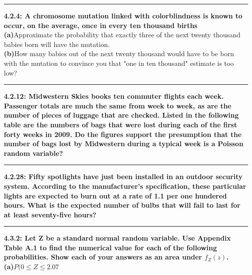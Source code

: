 \documentclass[11pt]{article}
\newcommand\question[2]{\vspace{.25in}\hrule\textbf{#1: #2}\vspace{.5em}\vspace{.10in}}
\renewcommand\part[1]{\vspace{.10in}\textbf{(#1)}}
\begin{document}
\raggedright
\newcommand\NAME{Jonathan Lopez}  %
\newcommand\HWNUM{6}              %



\question{4.2.4}
{A chromosome mutation linked with colorblindness is known to occur, on the average,
once in every ten thousand births}
\\
\part{a}{Approximate the probability that exactly three of the next twenty thousand
babies born will have the mutation.}
\\
\part{b}{How many babies out of the next twenty thousand would have to be born with
the mutation to convince you that "one in ten thousand" estimate is too low?}
\\


\question{4.2.12}
{Midwestern Skies books ten commuter flights each week. Passenger totals are much
the same from week to week, as are the number of pieces of luggage that are checked.
Listed in the following table are the numbers of bags that were lost during each of
the first forty weeks in 2009. Do the figures support the presumption that the number
of bags lost by Midwestern during a typical week is a Poisson random variable?}
\\


\question{4.2.28}
{Fifty spotlights have just been installed in an outdoor security system. According 
to the manufacturer's specification, these particular lights are expected to burn
out at a rate of 1.1 per one hundered hours. What is the expected number of bulbs
that will fail to last for at least seventy-five hours?}
\\


\question{4.3.2}
{Let Z be a standard normal random variable. Use Appendix Table A.1 to find the
numerical value for each of the following probabilities. Show each of your answers
as an area under $f_{Z}(z)$.}
\\
\part{a}{$P(0 \leq Z \leq 2.07$}
\\
\end{document}
